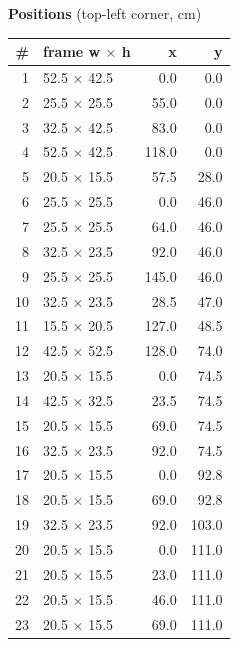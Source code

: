 \documentclass[a4paper,landscape,10pt]{article}
\begin{document}
\begin{minipage}[t]{0.25\textwidth}
\vspace{8pt}
{\bfseries Positions} (top-left corner, cm)\\[2pt]
\tiny
\begin{tabular}{@{}r l r r@{}}
\toprule
\# & frame w $\times$ h & x & y \\
\midrule
1 & 52.5 $\times$ 42.5 & 0.0 & 0.0 \\
2 & 25.5 $\times$ 25.5 & 55.0 & 0.0 \\
3 & 32.5 $\times$ 42.5 & 83.0 & 0.0 \\
4 & 52.5 $\times$ 42.5 & 118.0 & 0.0 \\
5 & 20.5 $\times$ 15.5 & 57.5 & 28.0 \\
6 & 25.5 $\times$ 25.5 & 0.0 & 46.0 \\
7 & 25.5 $\times$ 25.5 & 64.0 & 46.0 \\
8 & 32.5 $\times$ 23.5 & 92.0 & 46.0 \\
9 & 25.5 $\times$ 25.5 & 145.0 & 46.0 \\
10 & 32.5 $\times$ 23.5 & 28.5 & 47.0 \\
11 & 15.5 $\times$ 20.5 & 127.0 & 48.5 \\
12 & 42.5 $\times$ 52.5 & 128.0 & 74.0 \\
13 & 20.5 $\times$ 15.5 & 0.0 & 74.5 \\
14 & 42.5 $\times$ 32.5 & 23.5 & 74.5 \\
15 & 20.5 $\times$ 15.5 & 69.0 & 74.5 \\
16 & 32.5 $\times$ 23.5 & 92.0 & 74.5 \\
17 & 20.5 $\times$ 15.5 & 0.0 & 92.8 \\
18 & 20.5 $\times$ 15.5 & 69.0 & 92.8 \\
19 & 32.5 $\times$ 23.5 & 92.0 & 103.0 \\
20 & 20.5 $\times$ 15.5 & 0.0 & 111.0 \\
21 & 20.5 $\times$ 15.5 & 23.0 & 111.0 \\
22 & 20.5 $\times$ 15.5 & 46.0 & 111.0 \\
23 & 20.5 $\times$ 15.5 & 69.0 & 111.0 \\
\bottomrule
\end{tabular}
\end{minipage}
\clearpage
\end{document}
